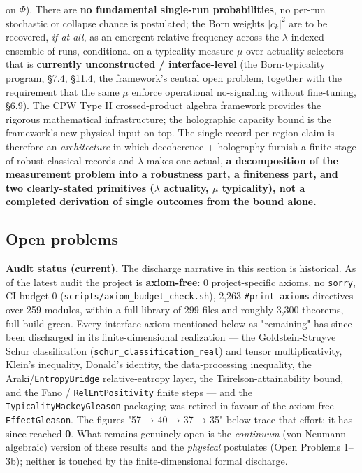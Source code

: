 \documentclass[11pt,a4paper]{article}
\newenvironment{qiqtquote}{\begin{mdframed}[style=quotestyle]}{\end{mdframed}}
\begin{document}
\begin{qiqtquote}
on $\Phi$). There are \textbf{no fundamental single-run probabilities}, no per-run stochastic or collapse chance is postulated; the Born weights $|c_k|^2$ are to be recovered, \emph{if at all}, as an emergent relative frequency across the $\lambda$-indexed ensemble of runs, conditional on a typicality measure $\mu$ over actuality selectors that is \textbf{currently unconstructed / interface-level} (the Born-typicality program, §7.4, §11.4, the framework's central open problem, together with the requirement that the same $\mu$ enforce operational no-signaling without fine-tuning, §6.9). The CPW Type II crossed-product algebra framework provides the rigorous mathematical infrastructure; the holographic capacity bound is the framework's new physical input on top. The single-record-per-region claim is therefore an \emph{architecture} in which decoherence + holography furnish a finite stage of robust classical records and $\lambda$ makes one actual, \textbf{a decomposition of the measurement problem into a robustness part, a finiteness part, and two clearly-stated primitives ($\lambda$ actuality, $\mu$ typicality), not a completed derivation of single outcomes from the bound alone.}
\end{qiqtquote}

\subsection{Open problems}

\begin{qiqtquote}
\textbf{Audit status (current).} The discharge narrative in this section is historical. As of the latest audit the project is \textbf{axiom-free}: 0 project-specific axioms, no \texttt{sorry}, CI budget 0 (\texttt{scripts/axiom\_budget\_check.sh}), 2,263 \texttt{\#print axioms} directives over 259 modules, within a full library of 299 files and roughly 3,300 theorems, full build green. Every interface axiom mentioned below as "remaining" has since been discharged in its finite-dimensional realization — the Goldstein-Struyve Schur classification (\texttt{schur\_classification\_real}) and tensor multiplicativity, Klein's inequality, Donald's identity, the data-processing inequality, the Araki/\texttt{EntropyBridge} relative-entropy layer, the Tsirelson-attainability bound, and the Fano / \texttt{RelEntPositivity} finite steps — and the \texttt{TypicalityMackeyGleason} packaging was retired in favour of the axiom-free \texttt{EffectGleason}. The figures "57 → 40 → 37 → 35" below trace that effort; it has since reached \textbf{0}. What remains genuinely open is the \emph{continuum} (von Neumann-algebraic) version of these results and the \emph{physical} postulates (Open Problems 1–3b); neither is touched by the finite-dimensional formal discharge.
\end{qiqtquote}
\end{document}
